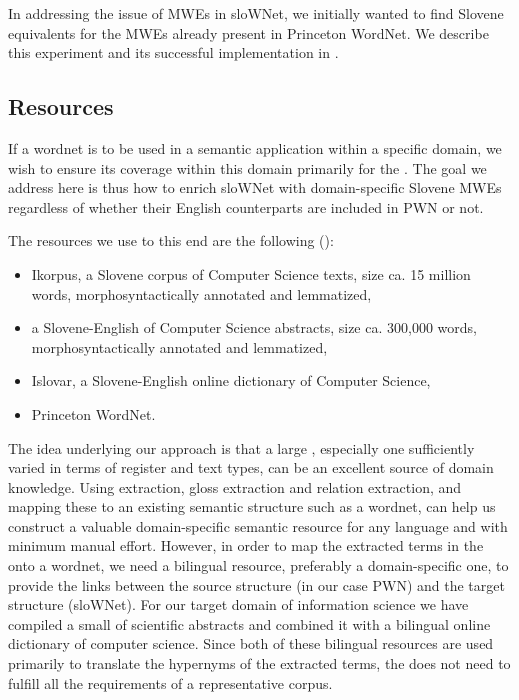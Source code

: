 \documentclass[output=paper]{LSP/langsci}
\begin{document}
In addressing the issue of MWEs in sloWNet, we initially wanted to find Slovene equivalents for the MWEs already present in Princeton WordNet. We describe this experiment and its successful implementation in \citep{Vintar2008}.

\subsection{Resources}\label{sec:vintar:3.2}

If a wordnet is to be used in a semantic application within a specific domain, we wish to ensure its coverage within this domain primarily for the . The goal we address here is thus how to enrich sloWNet with domain-specific Slovene MWEs regardless of whether their English counterparts are included in PWN or not.

The resources we use to this end are the following (): 

\begin{itemize}
\item 
Ikorpus, a Slovene corpus of Computer Science texts, size ca. 15 million words, morphosyntactically annotated and lemmatized,
\item  
a Slovene-English  of Computer Science abstracts, size ca. 300,000 words, morphosyntactically annotated and lemmatized,
\item 
Islovar, a Slovene-English online dictionary of Computer Science,
\item 
Princeton WordNet.
\end{itemize}

The idea underlying our approach is that a large , especially one sufficiently varied in terms of register and text types, can be an excellent source of domain knowledge. Using  extraction, gloss extraction and relation extraction, and mapping these to an existing semantic structure such as a wordnet, can help us construct a valuable domain-specific semantic resource for any language and with minimum manual effort. However, in order to map the extracted terms in the  onto a wordnet, we need a bilingual resource, preferably a domain-specific one, to provide the links between the source structure (in our case PWN) and the target structure (sloWNet). For our target domain of information science we have compiled a small  of scientific abstracts and combined it with a bilingual online dictionary of computer science. Since both of these bilingual resources are used primarily to translate the hypernyms of the extracted terms, the  does not need to fulfill all the requirements of a representative corpus.
\end{document}
